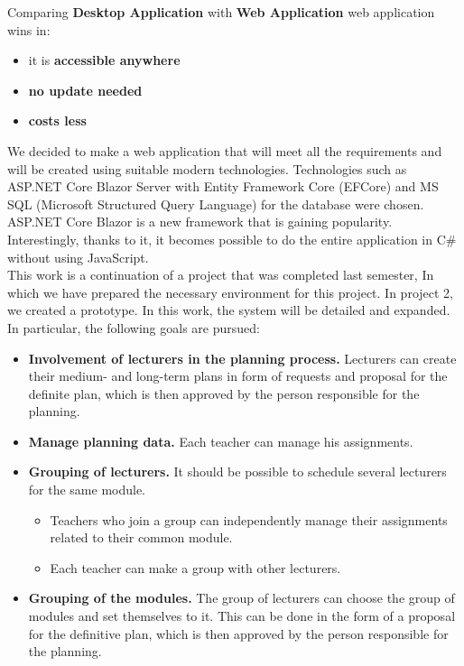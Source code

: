 \documentclass{scrartcl}
\begin{document}
Comparing \textbf{Desktop Application} with \textbf{Web Application} web application wins in:
\begin{itemize}
\item it is \textbf{accessible anywhere}
\item \textbf{no update needed }
\item \textbf{costs less} 
\end{itemize} 
 We decided to make a web application that will meet all the requirements and will be created using suitable modern technologies. Technologies such as ASP.NET Core Blazor Server with Entity Framework Core (EFCore) and MS SQL (Microsoft Structured Query Language) for the database were chosen. ASP.NET Core Blazor is a new framework that is gaining popularity. Interestingly, thanks to it, it becomes possible to do the entire application in C\# without using JavaScript.\\
This work is a continuation of a project that was completed last semester, In which we have prepared the necessary environment for this project.
In project 2, we created a prototype. In this work, the system will be detailed and expanded. In particular, the following goals are pursued:
\begin{itemize}
\item \textbf{Involvement of lecturers in the planning process.}
Lecturers can create their medium- and long-term plans in form of requests and proposal for the definite plan, which is then approved by the person responsible for the planning.
\item \textbf{Manage planning data.} Each teacher can manage his assignments.
\item \textbf{Grouping of lecturers.} It should be possible to schedule several lecturers for the same module.
   \begin{itemize}
   \item Teachers who join a group can independently manage their assignments related to their common module.
   \item Each teacher can make a group with other lecturers.
   \end{itemize}
 \item \textbf{Grouping of the modules.} The group of lecturers can choose the group of modules and set themselves to it. This can be done in the form of a proposal for the definitive plan, which is then approved by the person responsible for the planning.
\end{itemize}
\end{document}
